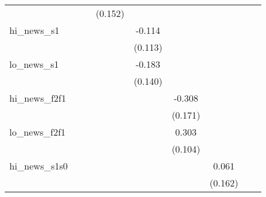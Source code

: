 {\begin{tabular}{l*{8}{c}}
            &                     &                     &     (0.152)         &                     &                     &                     &                     &                     \\
\addlinespace
hi\_news\_s1  &                     &                     &                     &      -0.114         &                     &                     &                     &                     \\
            &                     &                     &                     &     (0.113)         &                     &                     &                     &                     \\
\addlinespace
lo\_news\_s1  &                     &                     &                     &      -0.183         &                     &                     &                     &                     \\
            &                     &                     &                     &     (0.140)         &                     &                     &                     &                     \\
\addlinespace
hi\_news\_f2f1&                     &                     &                     &                     &      -0.308\sym{*}  &                     &                     &                     \\
            &                     &                     &                     &                     &     (0.171)         &                     &                     &                     \\
\addlinespace
lo\_news\_f2f1&                     &                     &                     &                     &       0.303\sym{***}&                     &                     &                     \\
            &                     &                     &                     &                     &     (0.104)         &                     &                     &                     \\
\addlinespace
hi\_news\_s1s0&                     &                     &                     &                     &                     &       0.061         &                     &                     \\
            &                     &                     &                     &                     &                     &     (0.162)         &                     &                     \\

\end{tabular}}
